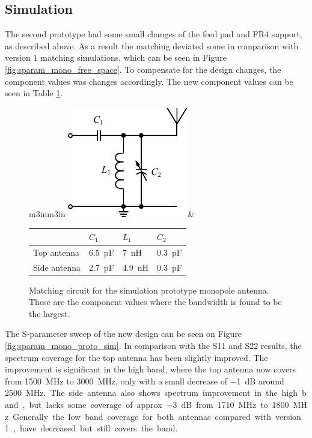 \FloatBarrier
\subsection{Simulation}
The second prototype had some small changes of the feed pad and FR4 support, as described above. As a result the matching deviated some in comparison with version 1 matching simulations, which can be seen in Figure \ref{fig:sparam_mono_free_space}. To compensate for the design changes, the component values was changes accordingly. The new component values can be seen in Table \ref{fig:mono_proto_sim_matching}.

\begin{figure}[htbp]
        \centering
        \begin{tabular}{m{3in}m{3in}}
            \centering
            \includegraphics{img/tech_sol/schematic_tuning_1}&
            \centering
            \footnotesize
            \begin{tabular}{|l|l|l|l|}
                \hline
                & $C_1$ & $L_1$ & $C_2$ \\
                \hline
                Top antenna & \SI{6.5}{pF} & \SI{7}{nH} & \SI{0.3}{pF} \\
                Side antenna & \SI{2.7}{pF} & \SI{4.9}{nH} & \SI{0.3}{pF} \\
                \hline
            \end{tabular}
        \end{tabular}
    \caption{Matching circuit for the simulation prototype monopole antenna. These are the component values where the bandwidth is found to be the largest.}
    \label{fig:mono_proto_sim_matching}
\end{figure}

The S-parameter sweep of the new design can be seen on Figure \ref{fig:sparam_mono_proto_sim}. In comparison with the S11 and S22 results, the spectrum coverage for the top antenna has been slightly improved. The improvement is significant in the high band, where the top antenna now covers from \SI{1500}{MHz} to \SI{3000}{MHz}, only with a small decrease of \SI{-1}{dB} around \SI{2500}{MHz.}. The side antenna also shows spectrum improvement in the high band, but lacks some coverage of approx \SI{-3}{dB} from \SI{1710}{MHz} to \SI{1800}{MHz}. Generally the low band coverage for both antennas compared with version 1, have decreased but still covers the band.

